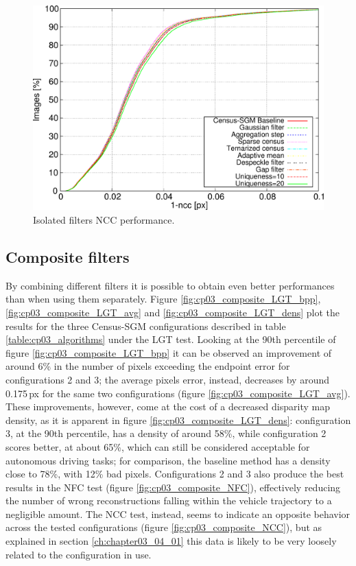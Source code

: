\begin{figure}[h!]
  \centering
  \includegraphics[width=\textwidth, height=0.5\textwidth, trim=0 0 0 0,clip]{filt_ncc}
  \caption{ Isolated filters NCC performance.}
  \label{fig:cp03_isolated_NCC}
\end{figure}%

\subsection{Composite filters}\label{ch:chapter03_04_02}

By combining different filters it is possible to obtain even better performances than when using them separately. Figure \ref{fig:cp03_composite_LGT_bpp}, \ref{fig:cp03_composite_LGT_avg} and \ref{fig:cp03_composite_LGT_dens} plot the results for the three Census-SGM configurations described in table \ref{table:cp03_algorithms} under the LGT test. Looking at the 90th percentile of figure \ref{fig:cp03_composite_LGT_bpp} it can be observed an improvement of around 6\% in the number of pixels exceeding the endpoint error for configurations 2 and 3; the average pixels error, instead, decreases by around 0.175\,px for the same two configurations (figure \ref{fig:cp03_composite_LGT_avg}). These improvements, however, come at the cost of a decreased disparity map density, as it is apparent in figure \ref{fig:cp03_composite_LGT_dens}: configuration 3, at the 90th percentile, has a density of around 58\%, while configuration 2 scores better, at about 65\%, which can still be considered acceptable for autonomous driving tasks; for comparison, the baseline 
method has a density close to 78\%, with 12\% bad pixels. Configurations 2 and 3 also produce the best results in the NFC test (figure \ref{fig:cp03_composite_NFC}), effectively reducing the number of wrong reconstructions falling within the vehicle trajectory to a negligible amount. The NCC test, instead, seems to indicate an opposite behavior across the tested configurations (figure \ref{fig:cp03_composite_NCC}), but as explained in section \ref{ch:chapter03_04_01} this data is likely to be very loosely related to the configuration in use.

